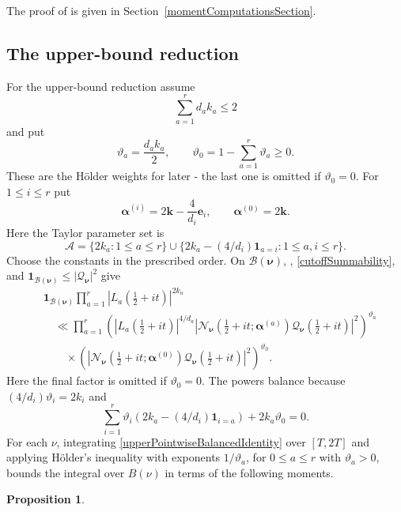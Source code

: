 \documentclass[oneside, 12pt]{amsart}
\newtheorem{prop}[thm]{Proposition}
\theoremstyle{definition}
\begin{document}
{		The proof of  is given in
		Section~\ref{momentComputationsSection}.
		
		\subsection{The upper-bound reduction}
		
		For the upper-bound reduction assume
		\begin{equation}\label{upperAdmissibleRange}
			\sum_{a=1}^r d_ak_a\leq2
		\end{equation}
		and put
		\[
		\vartheta_a=\frac{d_ak_a}{2},
		\qquad
		\vartheta_0=1-\sum_{a=1}^r\vartheta_a\geq0.
		\]
		These are the Hölder weights for later - the last one is omitted if $\vartheta_0=0$.
		For $1\leq i\leq r$ put
		\[
		\boldsymbol\alpha^{(i)}=2\boldsymbol k-\frac4{d_i}\boldsymbol e_i,
		\qquad
		\boldsymbol\alpha^{(0)}=2\boldsymbol k.
		\]
		Here the Taylor parameter set is
		\[
		\mathscr A=\{2k_a:1\leq a\leq r\}
		\cup\{2k_a-(4/d_i)\mathbf1_{a=i}:
		1\leq a,i\leq r\}.
		\]
		Choose the constants in the prescribed order.  On
		$\mathscr B(\boldsymbol\nu)$, ,
		\eqref{cutoffSummability}, and
		$\mathbf1_{\mathscr B(\boldsymbol\nu)}\leq|\mathcal Q_{\boldsymbol\nu}|^2$
		give
		\begin{align}
			&\mathbf1_{\mathscr B(\boldsymbol\nu)}
			\prod_{a=1}^r|L_a(\tfrac12+it)|^{2k_a}\nonumber\\
			&\quad\ll
			\prod_{a=1}^r\left(
			|L_a(\tfrac12+it)|^{4/d_a}
			|\mathcal N_{\boldsymbol\nu}
			(\tfrac12+it;\boldsymbol\alpha^{(a)})
			\mathcal Q_{\boldsymbol\nu}(\tfrac12+it)|^2
			\right)^{\vartheta_a}\nonumber\\
			&\qquad\times\left(
			|\mathcal N_{\boldsymbol\nu}
			(\tfrac12+it;\boldsymbol\alpha^{(0)})
			\mathcal Q_{\boldsymbol\nu}(\tfrac12+it)|^2
			\right)^{\vartheta_0}.
			\label{upperPointwiseBalancedIdentity}
		\end{align}
		Here the final factor is omitted if $\vartheta_0=0$.
		The powers balance because
		$(4/d_i)\vartheta_i=2k_i$ and
		\[
		\sum_{i=1}^r\vartheta_i(2k_a-(4/d_i)\mathbf1_{i=a})
		+2k_a\vartheta_0=0.
		\]
		For each $\nu$, integrating \eqref{upperPointwiseBalancedIdentity}
		over $[T,2T]$ and applying H\"older's inequality with exponents
		$1/\vartheta_a$, for $0\le a\le r$ with $\vartheta_a>0$, bounds
		the integral over $B(\nu)$ in terms of the following moments.
		\begin{prop}\label{unifiedMeanValuesProposition}

\end{prop}}
\end{document}
